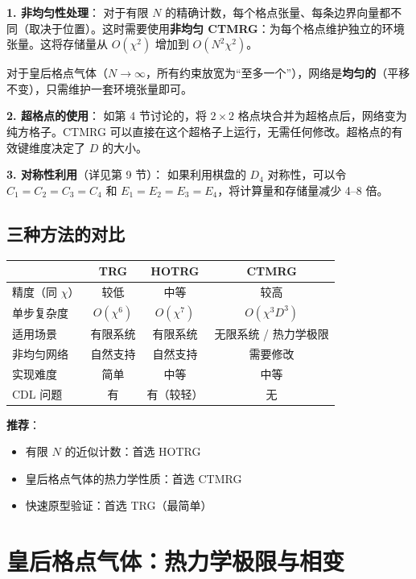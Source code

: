 \documentclass[12pt,a4paper]{ctexart}
\begin{document}
\textbf{1. 非均匀性处理}：
对于有限 $N$ 的精确计数，每个格点张量、每条边界向量都不同（取决于位置）。这时需要使用\textbf{非均匀 CTMRG}：为每个格点维护独立的环境张量。这将存储量从 $O(\chi^2)$ 增加到 $O(N^2 \chi^2)$。

对于皇后格点气体（$N \to \infty$，所有约束放宽为``至多一个''），网络是\textbf{均匀的}（平移不变），只需维护一套环境张量即可。

\textbf{2. 超格点的使用}：
如第 4 节讨论的，将 $2 \times 2$ 格点块合并为超格点后，网络变为纯方格子。CTMRG 可以直接在这个超格子上运行，无需任何修改。超格点的有效键维度决定了 $D$ 的大小。

\textbf{3. 对称性利用}（详见第 9 节）：
如果利用棋盘的 $D_4$ 对称性，可以令 $C_1 = C_2 = C_3 = C_4$ 和 $E_1 = E_2 = E_3 = E_4$，将计算量和存储量减少 4--8 倍。

\subsection{三种方法的对比}

\begin{center}
\begin{tabular}{lccc}
\toprule
 & TRG & HOTRG & CTMRG \\
\midrule
精度（同 $\chi$） & 较低 & 中等 & 较高 \\
单步复杂度 & $O(\chi^6)$ & $O(\chi^7)$ & $O(\chi^3 D^3)$ \\
适用场景 & 有限系统 & 有限系统 & 无限系统 / 热力学极限 \\
非均匀网络 & 自然支持 & 自然支持 & 需要修改 \\
实现难度 & 简单 & 中等 & 中等 \\
CDL 问题 & 有 & 有（较轻） & 无 \\
\bottomrule
\end{tabular}
\end{center}

\textbf{推荐}：
\begin{itemize}
\item 有限 $N$ 的近似计数：首选 HOTRG
\item 皇后格点气体的热力学性质：首选 CTMRG
\item 快速原型验证：首选 TRG（最简单）
\end{itemize}


\section{皇后格点气体：热力学极限与相变}
\end{document}
